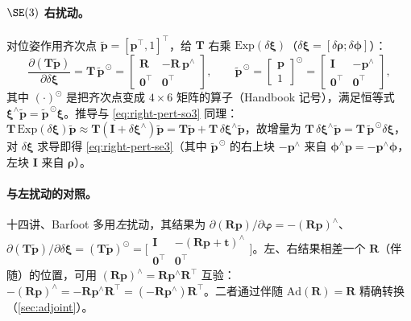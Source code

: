 \paragraph{$\SE(3)$ 右扰动。}对位姿作用齐次点 $\tilde{\mathbf{p}}=[\mathbf{p}^\top,1]^\top$，给 $\mathbf{T}$ 右乘 $\mathrm{Exp}(\delta\boldsymbol{\xi})$（$\delta\boldsymbol{\xi}=[\delta\boldsymbol{\rho};\delta\boldsymbol{\phi}]$）：
\begin{equation}
  \frac{\partial(\mathbf{T}\tilde{\mathbf{p}})}{\partial\delta\boldsymbol{\xi}}
  =\mathbf{T}\,\tilde{\mathbf{p}}^{\,\odot}
  =\begin{bmatrix}\mathbf{R}&-\mathbf{R}\,\mathbf{p}^\wedge\\\mathbf{0}^\top&\mathbf{0}^\top\end{bmatrix},
  \qquad
  \tilde{\mathbf{p}}^{\,\odot}=\begin{bmatrix}\mathbf{p}\\1\end{bmatrix}^{\!\odot}=\begin{bmatrix}\mathbf{I}&-\mathbf{p}^\wedge\\\mathbf{0}^\top&\mathbf{0}^\top\end{bmatrix},
  \label{eq:right-pert-se3}
\end{equation}
其中 $(\cdot)^\odot$ 是把齐次点变成 $4\times6$ 矩阵的算子（Handbook\cite{carlone2026handbook} 记号），满足恒等式 $\boldsymbol{\xi}^\wedge\tilde{\mathbf{p}}=\tilde{\mathbf{p}}^{\,\odot}\boldsymbol{\xi}$。推导与 \cref{eq:right-pert-so3} 同理：$\mathbf{T}\,\mathrm{Exp}(\delta\boldsymbol{\xi})\tilde{\mathbf{p}}\approx\mathbf{T}(\mathbf{I}+\delta\boldsymbol{\xi}^\wedge)\tilde{\mathbf{p}}=\mathbf{T}\tilde{\mathbf{p}}+\mathbf{T}\,\delta\boldsymbol{\xi}^\wedge\tilde{\mathbf{p}}$，故增量为 $\mathbf{T}\,\delta\boldsymbol{\xi}^\wedge\tilde{\mathbf{p}}=\mathbf{T}\,\tilde{\mathbf{p}}^{\,\odot}\delta\boldsymbol{\xi}$，对 $\delta\boldsymbol{\xi}$ 求导即得 \cref{eq:right-pert-se3}（其中 $\tilde{\mathbf{p}}^{\,\odot}$ 的右上块 $-\mathbf{p}^\wedge$ 来自 $\boldsymbol{\phi}^\wedge\mathbf{p}=-\mathbf{p}^\wedge\boldsymbol{\phi}$，左块 $\mathbf{I}$ 来自 $\boldsymbol{\rho}$）。

\paragraph{与左扰动的对照。}十四讲、Barfoot 多用\emph{左}扰动，其结果为 $\partial(\mathbf{R}\mathbf{p})/\partial\boldsymbol{\varphi}=-(\mathbf{R}\mathbf{p})^\wedge$、$\partial(\mathbf{T}\tilde{\mathbf{p}})/\partial\delta\boldsymbol{\xi}=(\mathbf{T}\tilde{\mathbf{p}})^\odot=\big[\begin{smallmatrix}\mathbf{I}&-(\mathbf{R}\mathbf{p}+\mathbf{t})^\wedge\\\mathbf{0}^\top&\mathbf{0}^\top\end{smallmatrix}\big]$。左、右结果相差一个 $\mathbf{R}$（伴随）的位置，可用 $(\mathbf{R}\mathbf{p})^\wedge=\mathbf{R}\mathbf{p}^\wedge\mathbf{R}^\top$ 互验：$-(\mathbf{R}\mathbf{p})^\wedge=-\mathbf{R}\mathbf{p}^\wedge\mathbf{R}^\top=(-\mathbf{R}\mathbf{p}^\wedge)\mathbf{R}^\top$。二者通过伴随 $\mathrm{Ad}(\mathbf{R})=\mathbf{R}$ 精确转换（\cref{sec:adjoint}）。

